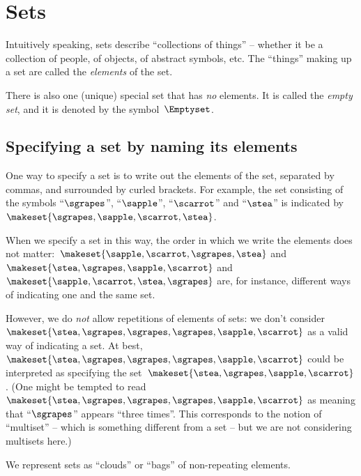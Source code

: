 
\section{Sets}

Intuitively speaking, sets describe ``collections of things'' -- whether it be a collection of people, of objects, of abstract symbols, etc.
The ``things'' making up a set are called the \emph{elements} of the set.

There is also one (unique) special set that has \emph{no} elements.
It is called the \emph{empty set}, and it is denoted by the symbol~$\Emptyset$.

\subsection{Specifying a set by naming its elements}

One way to specify a set is to write out the elements of the set, separated by commas, and surrounded by curled brackets.
For example, the set consisting of the symbols ``$\sgrapes$'', ``$\sapple$'', ``$\scarrot$'' and ``$\stea$'' is indicated by~$\makeset{ \sgrapes, \sapple, \scarrot, \stea}$.

When we specify a set in this way, the order in which we write the elements does not matter:~$\makeset{ \sapple, \scarrot, \sgrapes, \stea}$ and~$\makeset{ \stea, \sgrapes, \sapple, \scarrot}$ and~$\makeset{ \sapple, \scarrot, \stea, \sgrapes}$ are, for instance, different ways of indicating one and the same set.

However, we do \emph{not} allow repetitions of elements of sets: we don't consider~$\makeset{ \stea, \sgrapes, \sgrapes, \sgrapes, \sapple, \scarrot }$ as a valid way of indicating a set.
At best,~$\makeset{ \stea, \sgrapes, \sgrapes, \sgrapes, \sapple, \scarrot }$ could be interpreted as specifying the set~$\makeset{ \stea, \sgrapes, \sapple, \scarrot }$.
(One might be tempted to read $\makeset{ \stea, \sgrapes, \sgrapes, \sgrapes, \sapple, \scarrot }$ as meaning that ``$\sgrapes$'' appears ``three times''.
This corresponds to the notion of ``multiset'' -- which is something different from a set -- but we are not considering multisets here.)

\begin{marginfigure}
    \centering
    \caption{We represent sets as ``clouds'' or ``bags'' of non-repeating elements.}
    \label{fig:set_as_clouds}
\end{marginfigure}

